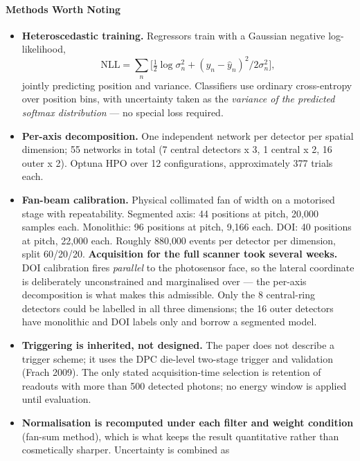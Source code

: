 \paragraph{Methods Worth Noting}
\begin{itemize}
    \item \textbf{Heteroscedastic training.} Regressors train with a Gaussian
        negative log-likelihood,
        \[\mathrm{NLL} = \sum_n \bigl[\tfrac{1}{2}\log \sigma_n^2
            + (y_n - \hat{y}_n)^2 / 2\sigma_n^2\bigr],\]
        jointly predicting position and variance. Classifiers use ordinary
        cross-entropy over position bins, with uncertainty taken as the \emph{variance of
        the predicted softmax distribution} --- no special loss required.
    \item \textbf{Per-axis decomposition.} One independent network per detector per spatial
        dimension; 55 networks in total (7 central detectors x 3, 1 central x 2, 16 outer
        x 2). Optuna HPO over 12 configurations, approximately 377 trials each.
    \item \textbf{Fan-beam calibration.} Physical collimated fan of  width on a
        motorised stage with  repeatability. Segmented axis: 44 positions at 
        pitch, 20{,}000 samples each. Monolithic: 96 positions at  pitch, 9{,}166
        each. DOI: 40 positions at  pitch, 22{,}000 each. Roughly 880{,}000 events
        per detector per dimension, split 60/20/20. \textbf{Acquisition for the full
        scanner took several weeks.} DOI calibration fires \emph{parallel} to the
        photosensor face, so the lateral coordinate is deliberately unconstrained and
        marginalised over --- the per-axis decomposition is what makes this admissible.
        Only the 8 central-ring detectors could be labelled in all three dimensions; the 16
        outer detectors have monolithic and DOI labels only and borrow a segmented model.
    \item \textbf{Triggering is inherited, not designed.} The paper does not describe a
        trigger scheme; it uses the DPC die-level two-stage trigger and validation (Frach
        2009). The only stated acquisition-time selection is retention of readouts with
        more than 500 detected photons; no energy window is applied until evaluation.
    \item \textbf{Normalisation is recomputed under each filter and weight condition}
        (fan-sum method), which is what keeps the result quantitative rather than
        cosmetically sharper. Uncertainty is combined as

\end{itemize}
